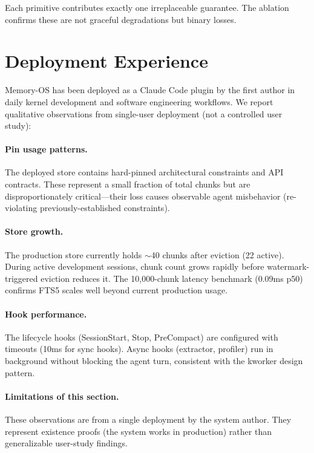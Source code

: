 \documentclass[10pt,twocolumn]{article}
\begin{document}
Each primitive contributes exactly one irreplaceable guarantee. The ablation confirms these are not graceful degradations but binary losses.

\section{Deployment Experience}
\label{sec:deployment}

Memory-OS has been deployed as a Claude Code plugin by the first author in daily kernel development and software engineering workflows. We report qualitative observations from single-user deployment (not a controlled user study):

\paragraph{Pin usage patterns.} The deployed store contains hard-pinned architectural constraints and API contracts. These represent a small fraction of total chunks but are disproportionately critical---their loss causes observable agent misbehavior (re-violating previously-established constraints).

\paragraph{Store growth.} The production store currently holds $\sim$40 chunks after eviction (22 active). During active development sessions, chunk count grows rapidly before watermark-triggered eviction reduces it. The 10{,}000-chunk latency benchmark (0.09ms p50) confirms FTS5 scales well beyond current production usage.

\paragraph{Hook performance.} The lifecycle hooks (SessionStart, Stop, PreCompact) are configured with timeouts (10ms for sync hooks). Async hooks (extractor, profiler) run in background without blocking the agent turn, consistent with the kworker design pattern.

\paragraph{Limitations of this section.} These observations are from a single deployment by the system author. They represent existence proofs (the system works in production) rather than generalizable user-study findings.
\end{document}
